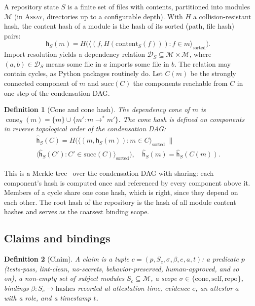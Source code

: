 \documentclass[conference]{IEEEtran}
\newtheorem{definition}{Definition}
\newcommand{\assay}{\textsc{Assay}}
\newcommand{\cone}{\operatorname{cone}}
\newcommand{\hash}{\mathsf{h}}
\newcommand{\chash}{\hat{\mathsf{h}}}
\newcommand{\Mods}{\mathcal{M}}
\newcommand{\Deps}{\mathcal{D}}
\begin{document}
A repository state $S$ is a finite set of files with contents, partitioned into modules $\Mods$ (in \assay{}, directories up to a configurable depth). With $H$ a collision-resistant hash, the content hash of a module is the hash of its sorted (path, file hash) pairs:
\[
\hash_S(m) = H\big(\langle (f, H(\text{content}_S(f))) : f \in m \rangle_{\text{sorted}}\big).
\]
Import resolution yields a dependency relation $\Deps_S \subseteq \Mods \times \Mods$, where $(a, b) \in \Deps_S$ means some file in $a$ imports some file in $b$. The relation may contain cycles, as Python packages routinely do. Let $C(m)$ be the strongly connected component of $m$ and $\mathrm{succ}(C)$ the components reachable from $C$ in one step of the condensation DAG.

\begin{definition}[Cone and cone hash]
The dependency cone of $m$ is $\cone_S(m) = \{m\} \cup \{m' : m \to^{*} m'\}$. The cone hash is defined on components in reverse topological order of the condensation DAG:
\begin{multline*}
\chash_S(C) = H\Big(\langle (m, \hash_S(m)) : m \in C \rangle_{\text{sorted}} \;\|\\
\langle \chash_S(C') : C' \in \mathrm{succ}(C) \rangle_{\text{sorted}}\Big),
\quad \chash_S(m) = \chash_S(C(m)).
\end{multline*}
\end{definition}

This is a Merkle tree~\citep{merkle1987} over the condensation DAG with sharing: each component's hash is computed once and referenced by every component above it. Members of a cycle share one cone hash, which is right, since they depend on each other. The root hash of the repository is the hash of all module content hashes and serves as the coarsest binding scope.

\subsection{Claims and bindings}

\begin{definition}[Claim]
A claim is a tuple $c = (p, S_c, \sigma, \beta, e, a, t)$: a predicate $p$ (\emph{tests-pass}, \emph{lint-clean}, \emph{no-secrets}, \emph{behavior-preserved}, \emph{human-approved}, and so on), a non-empty set of subject modules $S_c \subseteq \Mods$, a scope $\sigma \in \{\text{cone}, \text{self}, \text{repo}\}$, bindings $\beta : S_c \to \text{hashes}$ recorded at attestation time, evidence $e$, an attestor $a$ with a role, and a timestamp $t$.
\end{definition}
\end{document}
